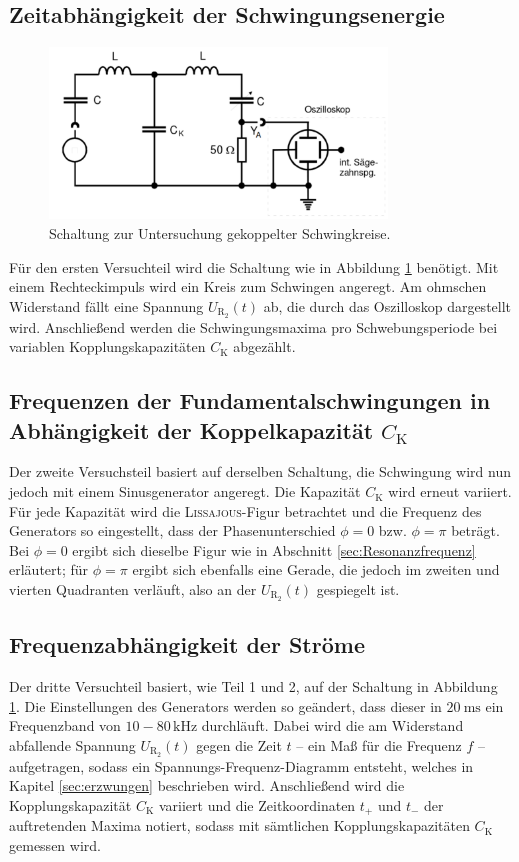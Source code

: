 \subsection{Zeitabhängigkeit der Schwingungsenergie}
\begin{figure}[h]
	\centering
		\includegraphics[width=0.8\textwidth]{Bilder/Versuchsaufbau.pdf}		
\caption{Schaltung zur Untersuchung gekoppelter Schwingkreise. \cite{v355}}
	\label{fig:versuchsaufbau}
\end{figure}
Für den ersten Versuchteil wird die Schaltung wie in Abbildung \ref{fig:versuchsaufbau} benötigt. Mit einem Rechteckimpuls wird ein Kreis zum Schwingen angeregt. Am ohmschen Widerstand fällt eine Spannung $U_\mathup{R_2}(t)$ ab, die durch das Oszilloskop dargestellt wird. Anschließend werden die Schwingungsmaxima pro Schwebungsperiode bei variablen Kopplungskapazitäten $C_\mathup{K}$ abgezählt.

\subsection{Frequenzen der Fundamentalschwingungen in Abhängigkeit der Koppelkapazität $C_\text{K}$}
Der zweite Versuchsteil basiert auf derselben Schaltung, die Schwingung wird nun jedoch mit einem Sinusgenerator angeregt.
Die Kapazität $C_\mathup{K}$ wird erneut variiert. Für jede Kapazität wird die \textsc{Lissajous}-Figur betrachtet und die Frequenz des Generators so eingestellt, dass der Phasenunterschied $\phi=0$ bzw. $\phi=\pi$ beträgt. 
Bei $\phi=0$ ergibt sich dieselbe Figur wie in Abschnitt \ref{sec:Resonanzfrequenz} erläutert; 
für $\phi=\pi$  ergibt sich ebenfalls eine Gerade, die jedoch im zweiten und vierten Quadranten verläuft, also an der $U_\mathup{R_2}(t)$ gespiegelt ist.

\subsection{Frequenzabhängigkeit der Ströme}
\label{sec:Frequenzgenerator}
Der dritte Versuchteil basiert, wie Teil 1 und 2, auf der Schaltung in Abbildung \ref{fig:versuchsaufbau}. Die Einstellungen des Generators werden so geändert, dass dieser in $\SI{20}{\milli\second}$ ein Frequenzband von $10-80\,\si{\kilo\hertz}$ durchläuft.
Dabei wird die am Widerstand abfallende Spannung $U_\mathup{R_2}(t)$ gegen die Zeit $t$ -- ein Maß für die Frequenz $f$ -- aufgetragen, sodass ein Spannungs-Frequenz-Diagramm entsteht, welches in Kapitel \ref{sec:erzwungen} beschrieben wird.
Anschließend wird die Kopplungskapazität $C_\text{K}$ variiert und die Zeitkoordinaten $t_+$ und $t_-$ der auftretenden Maxima notiert, sodass mit sämtlichen Kopplungskapazitäten $C_\text{K}$ gemessen wird.
